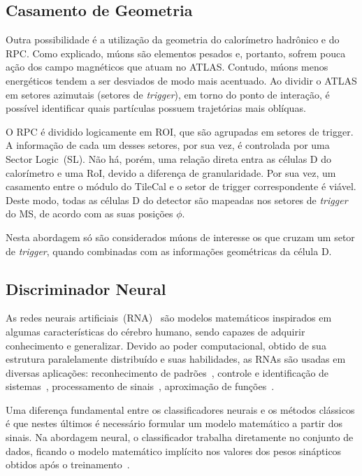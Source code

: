 \subsection*{Casamento de Geometria}

Outra possibilidade é a utilização da geometria do calorímetro hadrônico e do
RPC. Como explicado, múons são elementos pesados e, portanto, sofrem pouca ação
dos campo magnéticos que atuam no ATLAS. Contudo, múons menos energéticos tendem
a ser desviados de modo mais acentuado. Ao dividir o ATLAS em setores azimutais
(setores de \emph{trigger}), em torno do ponto de interação, é possível
identificar quais partículas possuem trajetórias mais oblíquas.

O RPC é dividido logicamente em ROI, que são agrupadas em
setores de trigger. A informação de cada um desses setores, por sua vez, é
controlada por uma Sector Logic~(SL). Não há, porém, uma relação direta entra as
células D do calorímetro e uma RoI, devido a diferença de granularidade. Por sua
vez, um casamento entre o módulo do TileCal e o setor de trigger correspondente
é viável. Deste modo, todas as células D do detector são mapeadas nos setores de
\emph{trigger} do MS, de acordo com as suas posições $\phi$.

Nesta abordagem só são considerados múons de interesse os que cruzam um setor de
\emph{trigger}, quando combinadas com as informações geométricas da célula D.



\subsection*{Discriminador Neural}

As redes neurais artificiais~(RNA)~\cite{WASSERMAN1989,HAYKIN2008} são modelos
matemáticos inspirados em algumas características do cérebro humano, sendo
capazes de adquirir conhecimento e generalizar. Devido ao poder computacional,
obtido de sua estrutura paralelamente distribuído e suas habilidades, as RNAs
são usadas em diversas aplicações: reconhecimento de padrões~\cite{BISHOP1995},
controle e identificação de sistemas~\cite{ICHIKAWA1992}, processamento de
sinais~\cite{LAPEDES1987}, aproximação de funções~\cite{DENG2011}.

Uma diferença fundamental entre os classificadores neurais e os métodos
clássicos é que nestes últimos é necessário formular um modelo matemático a
partir dos sinais. Na abordagem neural, o classificador trabalha diretamente no
conjunto de dados, ficando o modelo matemático implícito nos valores dos pesos
sinápticos obtidos após o treinamento~\cite{ref:SIMAS}.

